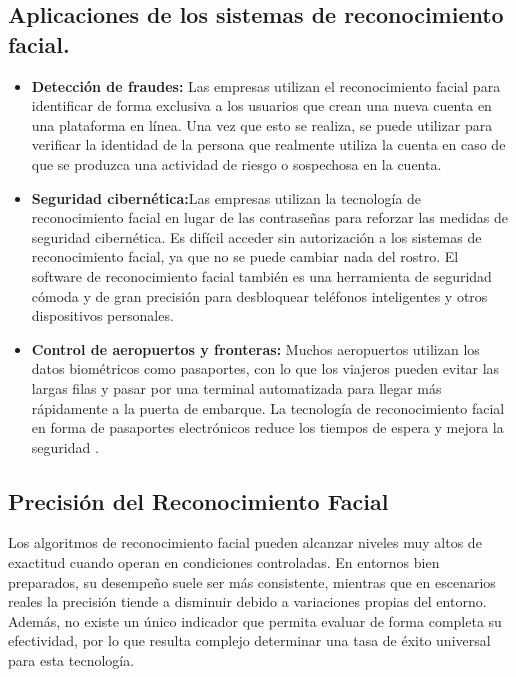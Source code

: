 \subsection{Aplicaciones de los sistemas de reconocimiento facial.}
\begin{itemize}
  \item \textbf{Detección de fraudes:} Las empresas utilizan el reconocimiento facial para identificar de forma
exclusiva a los usuarios que crean una nueva cuenta en una plataforma en
línea. Una vez que esto se realiza, se puede utilizar 
para verificar la identidad de la persona que realmente utiliza la cuenta en
caso de que se produzca una actividad de riesgo o sospechosa en la cuenta\cite{facialAWS}.
  \item \textbf{Seguridad cibernética:}Las empresas utilizan la tecnología de reconocimiento facial en lugar de
las contraseñas para reforzar las medidas de seguridad cibernética. Es difícil
acceder sin autorización a los sistemas de reconocimiento facial, ya que no se
puede cambiar nada del rostro. El software de reconocimiento facial también
es una herramienta de seguridad cómoda y de gran precisión para desbloquear
teléfonos inteligentes y otros dispositivos personales\cite{facialAWS}.
  \item \textbf{Control de aeropuertos y fronteras:} Muchos aeropuertos utilizan los datos biométricos como pasaportes, con lo
que los viajeros pueden evitar las largas filas y pasar por una terminal automatizada para llegar más rápidamente a la puerta de embarque. La tecnología de
reconocimiento facial en forma de pasaportes electrónicos reduce los tiempos de espera y mejora la seguridad \cite{facialAWS}.
  \end{itemize}


\subsection{Precisión del Reconocimiento Facial}

Los algoritmos de reconocimiento facial pueden alcanzar niveles muy altos de exactitud cuando operan en condiciones controladas. En entornos bien preparados, su desempeño suele ser más consistente, mientras que en escenarios reales la precisión tiende a disminuir debido a variaciones propias del entorno. Además, no existe un único indicador que permita evaluar de forma completa su efectividad, por lo que resulta complejo determinar una tasa de éxito universal para esta tecnología\cite{reconocimientoKaspersky,azureFaceRecognition}.


